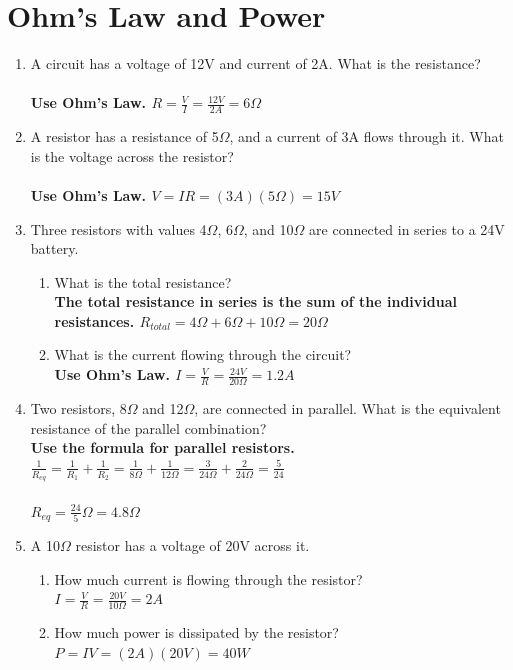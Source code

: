 \documentclass{article}
\begin{document}
\section*{Ohm's Law and Power}
\begin{enumerate}
    \item A circuit has a voltage of 12V and current of 2A. What is the resistance?\\\\
    \textbf{Use Ohm's Law. $R = \frac{V}{I} = \frac{12 V}{2 A} = 6 \Omega$}\\
    \item A resistor has a resistance of 5$\Omega$, and a current of 3A flows through it. What is the voltage across the resistor?\\\\
    \textbf{Use Ohm's Law. $V = IR = (3A)(5\Omega) = 15 V$}\\
    \item Three resistors with values 4$\Omega$, 6$\Omega$, and 10$\Omega$ are connected in series to a 24V battery.
    \begin{enumerate}[label=\alph*.]
        \item What is the total resistance? \\
        \textbf{The total resistance in series is the sum of the individual resistances. $R_{total} = 4\Omega + 6\Omega + 10\Omega = 20\Omega$} \\
        \item What is the current flowing through the circuit? \\
        \textbf{Use Ohm's Law. $I = \frac{V}{R} = \frac{24 V}{20 \Omega} = 1.2 A$} \\
    \end{enumerate}
    \item {Two resistors, 8$\Omega$ and 12$\Omega$, are connected in parallel. What is the equivalent resistance of the parallel combination?}\\
    \textbf{Use the formula for parallel resistors. $\frac{1}{R_{eq}} = \frac{1}{R_1} + \frac{1}{R_2} = \frac{1}{8\Omega} + \frac{1}{12\Omega} = \frac{3}{24\Omega} + \frac{2}{24\Omega} = \frac{5}{24}$}\\\\
    \textbf{$R_{eq} = \frac{24}{5} \Omega = 4.8 \Omega$}\\
    \item {A 10$\Omega$ resistor has a voltage of 20V across it.}
    \begin{enumerate}[label=\alph*.]
        \item {How much current is flowing through the resistor?}\\
        \textbf{$I = \frac{V}{R} = \frac{20 V}{10 \Omega} = 2 A$}\\
        \item {How much power is dissipated by the resistor?}\\
        \textbf{$P = IV = (2 A)(20 V) = 40 W$}\\
    \end{enumerate}
    \newpage
\end{enumerate}
\end{document}
